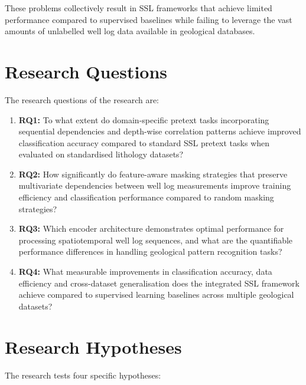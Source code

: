 These problems collectively result in SSL frameworks that achieve limited performance compared to supervised baselines while failing to leverage the vast amounts of unlabelled well log data available in geological databases.


\section{Research Questions}

The research questions of the research are:

\begin{enumerate}[label=\roman*.]
\item \textbf{RQ1:} To what extent do domain-specific pretext tasks incorporating sequential dependencies and depth-wise correlation patterns achieve improved classification accuracy compared to standard SSL pretext tasks when evaluated on standardised lithology datasets?

\item \textbf{RQ2:} How significantly do feature-aware masking strategies that preserve multivariate dependencies between well log measurements improve training efficiency and classification performance compared to random masking strategies?

\item \textbf{RQ3:} Which encoder architecture demonstrates optimal performance for processing spatiotemporal well log sequences, and what are the quantifiable performance differences in handling geological pattern recognition tasks?

\item \textbf{RQ4:} What measurable improvements in classification accuracy, data efficiency and cross-dataset generalisation does the integrated SSL framework achieve compared to supervised learning baselines across multiple geological datasets?
\end{enumerate}


\section{Research Hypotheses}

The research tests four specific hypotheses:

